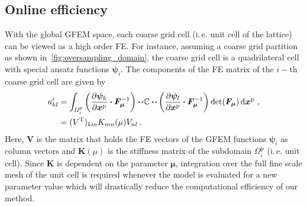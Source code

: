 \documentclass[a4paper]{eccomas_paper-2024}
\makeatletter
\newcommand{\ie}{i.\,e.\@\xspace}
\newcommand{\m}{\bm\mu}
\newcommand{\p}{\mathrm{p}}
\renewcommand{\top}{\mathrm{T}}
\makeatother
\begin{document}
\subsection{Online efficiency} %
\label{sub:Online efficiency}
With the global GFEM space, each coarse grid cell (\ie{} unit cell of the lattice) can be viewed as a high order FE.
For instance, assuming a coarse grid partition as shown in~\cref{fig:oversampling_domain}, the coarse grid cell is a quadrilateral cell with special ansatz functions $\bm{\psi}_i$.
The components of the FE matrix of the $i-$th coarse grid cell are given by
\begin{align}
    \begin{split}
        a^i_{kl} &= \int_{\varOmega^{\p}_i} \left(\pdv{\bm{\psi}_k}{\bm{x}^{\p}}\vdot\bm{F}^{-1}_{\m}\right)\vdot\!\vdot \mathbb{C} \vdot\!\vdot
    \left(\pdv{\bm{\psi}_l}{\bm{x}^{\p}}\vdot\bm{F}^{-1}_{\m}\right)\det(\bm{F}_{\m})\dd{\bm{x}^{\p}}\,,\\
                 &= ({V}^\top)_{km} {K}_{mn}(\mu){V}_{nl}\,.
    \end{split}
    \label{eq:element_matrix}
\end{align}
Here, $\bm{V}$ is the matrix that holds the FE vectors of the GFEM functions $\bm\psi_i$ as column vectors and $\bm{K}(\mu)$ is the stiffness matrix of the subdomain $\varOmega^{\p}_i$ (\ie{} unit cell).
Since $\bm{K}$ is dependent on the parameter $\m$, integration over the full fine scale mesh of the unit cell is required whenever the model is evaluated for a new parameter value which will drastically reduce the computational efficiency of our method.
\end{document}
